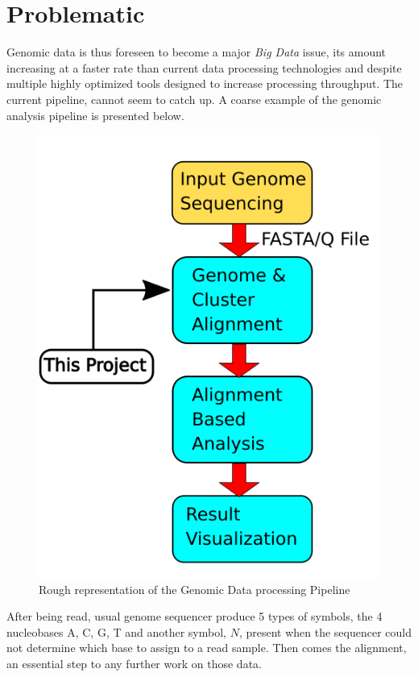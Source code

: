 \section{Problematic}

Genomic data is thus foreseen to become a major \textit{Big Data} issue, its amount increasing at a faster rate than current data processing technologies and despite multiple highly optimized tools designed to increase processing throughput. The current pipeline, cannot seem to catch up. A coarse example of the genomic analysis pipeline is presented below. \\

\begin{minipage}[t]{0.60\textwidth}
\begin{figure}[H]
    \centering
    \includegraphics[scale = 0.3]{Figures/pipeline.png}
    \caption{Rough representation of the Genomic Data processing Pipeline}
    \label{fig:analysispipe}
\end{figure}
\end{minipage}
\hfill
\begin{minipage}[t]{0.30\textwidth}
After being read, usual genome sequencer produce 5 types of symbols, the 4 nucleobases A, C, G, T and another symbol, $N$, present when the sequencer could not determine which base to assign to a read sample. Then comes the alignment, an essential step to any further work on those data. \\

\end{minipage}
\vspace*{5mm}



